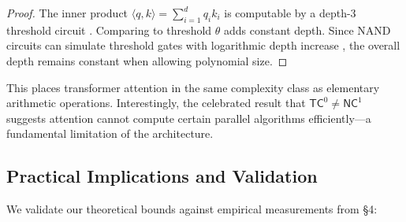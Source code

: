 \begin{proof}






The inner product $\langle q, k \rangle = \sum_{i=1}^d q_i k_i$ is computable by a depth-3 threshold circuit \cite{yao1990computing}. Comparing to threshold $\theta$ adds constant depth. Since NAND circuits can simulate threshold gates with logarithmic depth increase \cite{chandra1984constant}, the overall depth remains constant when allowing polynomial size.






\end{proof}













This places transformer attention in the same complexity class as elementary arithmetic operations. Interestingly, the celebrated result that $\mathsf{TC}^0 \neq \mathsf{NC}^1$ \cite{razborov1987lower} suggests attention cannot compute certain parallel algorithms efficiently---a fundamental limitation of the architecture.













\subsection{Practical Implications and Validation}













We validate our theoretical bounds against empirical measurements from §4:













